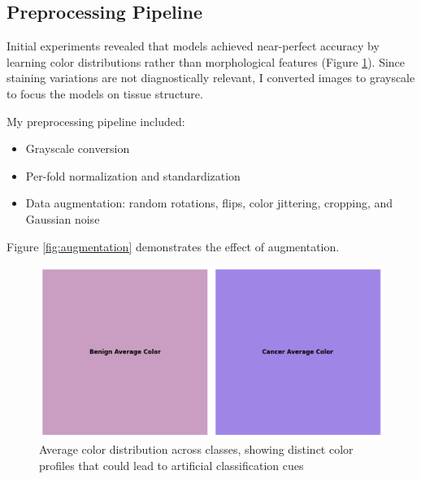 \documentclass[10pt,twocolumn]{article}
\begin{document}
\subsection{Preprocessing Pipeline}
Initial experiments revealed that models achieved near-perfect accuracy by learning color distributions rather than morphological features (Figure \ref{fig:color_distribution}). Since staining variations are not diagnostically relevant, I converted images to grayscale to focus the models on tissue structure.

My preprocessing pipeline included:
\begin{itemize}
    \item Grayscale conversion
    \item Per-fold normalization and standardization
    \item Data augmentation: random rotations, flips, color jittering, cropping, and Gaussian noise
\end{itemize}

Figure \ref{fig:augmentation} demonstrates the effect of augmentation.

\begin{figure}[h]
\centering
\includegraphics[width=0.8\columnwidth]{imgs/class_avg_colors_horz.png}
\caption{Average color distribution across classes, showing distinct color profiles that could lead to artificial classification cues}
\label{fig:color_distribution}
\end{figure}
\end{document}
